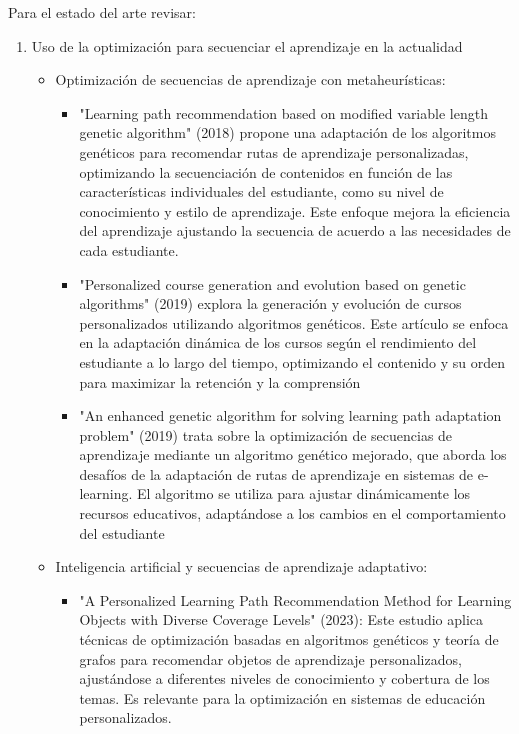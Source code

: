 \documentclass{article}
\begin{document}
Para el estado del arte revisar: 
\begin{enumerate}
    \item Uso de la optimización para secuenciar el aprendizaje en la actualidad
    \begin{itemize}
        \item Optimización de secuencias de aprendizaje con metaheurísticas: \begin{itemize}
            \item "Learning path recommendation based on modified variable length genetic algorithm" (2018) propone una adaptación de los algoritmos genéticos para recomendar rutas de aprendizaje personalizadas, optimizando la secuenciación de contenidos en función de las características individuales del estudiante, como su nivel de conocimiento y estilo de aprendizaje. Este enfoque mejora la eficiencia del aprendizaje ajustando la secuencia de acuerdo a las necesidades de cada estudiante. 
            \item "Personalized course generation and evolution based on genetic algorithms" (2019) explora la generación y evolución de cursos personalizados utilizando algoritmos genéticos. Este artículo se enfoca en la adaptación dinámica de los cursos según el rendimiento del estudiante a lo largo del tiempo, optimizando el contenido y su orden para maximizar la retención y la comprensión
            \item "An enhanced genetic algorithm for solving learning path adaptation problem" (2019) trata sobre la optimización de secuencias de aprendizaje mediante un algoritmo genético mejorado, que aborda los desafíos de la adaptación de rutas de aprendizaje en sistemas de e-learning. El algoritmo se utiliza para ajustar dinámicamente los recursos educativos, adaptándose a los cambios en el comportamiento del estudiante
        \end{itemize}
        \item Inteligencia artificial y secuencias de aprendizaje adaptativo: 
        \begin{itemize}
            \item "A Personalized Learning Path Recommendation Method for Learning Objects with Diverse Coverage Levels" (2023): Este estudio aplica técnicas de optimización basadas en algoritmos genéticos y teoría de grafos para recomendar objetos de aprendizaje personalizados, ajustándose a diferentes niveles de conocimiento y cobertura de los temas. Es relevante para la optimización en sistemas de educación personalizados.

\end{itemize}
\end{itemize}
\end{enumerate}
\end{document}

